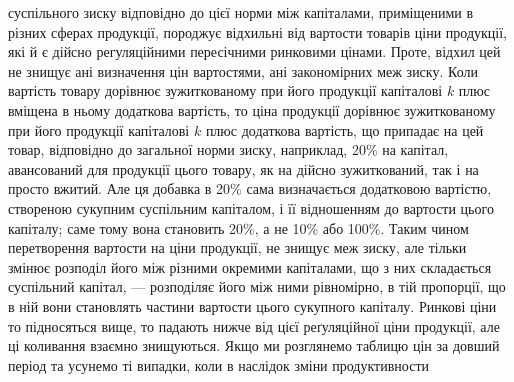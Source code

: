 суспільного зиску відповідно до цієї норми між капіталами, приміщеними в різних
сферах продукції, породжує відхильні від вартости товарів ціни продукції,
які й є дійсно регуляційними пересічними ринковими цінами. Проте, відхил цей
не знищує ані визначення цін вартостями, ані закономірних меж зиску. Коли
вартість товару дорівнює зужиткованому при його продукції капіталові $k$ плюс
вміщена в ньому додаткова вартість, то ціна продукції дорівнює зужиткованому
при його продукції капіталові $k$ плюс додаткова вартість, що припадає на цей
товар, відповідно до загальної норми зиску, наприклад, 20\% на капітал, авансований
для продукції цього товару, як на дійсно зужиткований, так і на просто
вжитий. Але ця добавка в 20\% сама визначається додатковою вартістю, створеною
сукупним суспільним капіталом, і її відношенням до вартости цього капіталу;
саме тому вона становить 20\%, а не 10\% або 100\%. Таким чином перетворення
вартости на ціни продукції, не знищує меж зиску, але тільки змінює
розподіл його між різними окремими капіталами, що з них складається суспільний
капітал, — розподіляє його між ними рівномірно, в тій пропорції, що в ній
вони становлять частини вартости цього сукупного капіталу. Ринкові ціни
то підносяться вище, то падають нижче від цієї реґуляційної ціни продукції,
але ці коливання взаємно знищуються. Якщо ми розглянемо таблицю цін за
довший період та усунемо ті випадки, коли в наслідок зміни продуктивности
\parbreak{}  %

